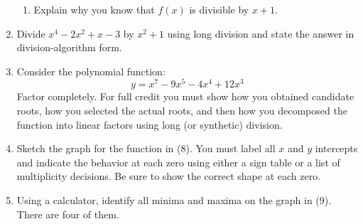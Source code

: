 \documentclass[letterpaper,12pt,fleqn]{article}
\begin{document}
\begin{enumerate}
\begin{enumerate}
  \item Explain why you know that $f(x)$ is divisible by $x+1$.

    \newpage

  \end{enumerate}

\item Divide $x^4-2x^2+x-3$ by $x^2+1$ using long division and state the
  answer in division-algorithm form.

  \newpage

\item Consider the polynomial function:
  \[y=x^7-9x^5-4x^4+12x^3\]
  Factor completely. For full credit you must show how you obtained candidate
  roots, how you selected the actual roots, and then how you decomposed the
  function into linear factors using long (or synthetic) division.

  \newpage

\item Sketch the graph for the function in (8). You must label all $x$ and $y$
  intercepts and indicate the behavior at each zero using either a sign table
  or a list of multiplicity decisions. Be sure to show the correct shape at
  each zero.

  \vspace{5in}

\item Using a calculator, identify all minima and maxima on the graph in
  (9). There are four of them.
  
\end{enumerate}
\end{document}

